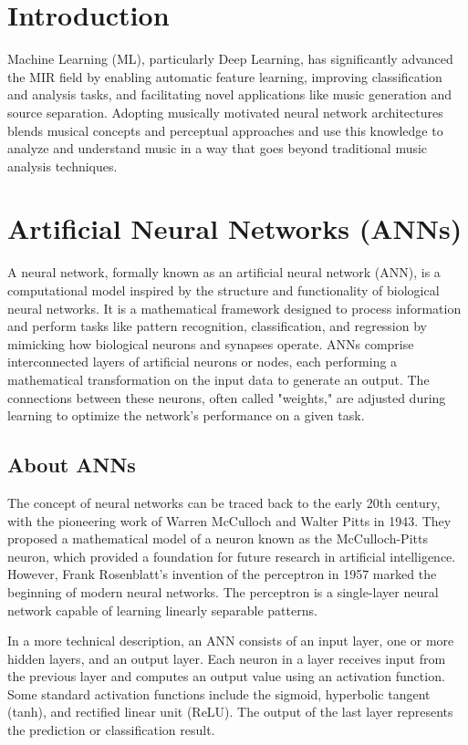 \section{Introduction}
Machine Learning (ML), particularly Deep Learning, has significantly advanced the MIR field by enabling automatic feature learning, improving classification and analysis tasks, and facilitating novel applications like music generation and source separation. Adopting musically motivated neural network architectures \cite{musicmotivCNN} blends musical concepts and perceptual approaches and use this knowledge to analyze and understand music in a way that goes beyond traditional music analysis techniques. 

\section{Artificial Neural Networks (ANNs)}
A neural network, formally known as an artificial neural network (ANN), is a computational model inspired by the structure and functionality of biological neural networks. It is a mathematical framework designed to process information and perform tasks like pattern recognition, classification, and regression by mimicking how biological neurons and synapses operate. ANNs comprise interconnected layers of artificial neurons or nodes, each performing a mathematical transformation on the input data to generate an output. The connections between these neurons, often called "weights," are adjusted during learning to optimize the network's performance on a given task.

\subsection{About ANNs}
The concept of neural networks can be traced back to the early 20th century, with the pioneering work of Warren McCulloch and Walter Pitts in 1943. They proposed a mathematical model of a neuron known as the McCulloch-Pitts neuron, which provided a foundation for future research in artificial intelligence. However, Frank Rosenblatt's invention of the perceptron in 1957 marked the beginning of modern neural networks. The perceptron is a single-layer neural network capable of learning linearly separable patterns.



In a more technical description, an ANN consists of an input layer, one or more hidden layers, and an output layer. Each neuron in a layer receives input from the previous layer and computes an output value using an activation function. Some standard activation functions include the sigmoid, hyperbolic tangent (tanh), and rectified linear unit (ReLU). The output of the last layer represents the prediction or classification result.

